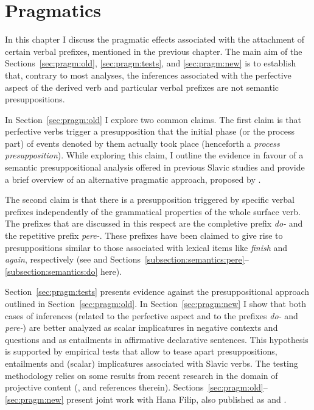 \chapter{Pragmatics} %
\label{Chapter6}
In this chapter I discuss the pragmatic effects associated with the attachment of certain verbal prefixes, mentioned in the previous chapter. The main aim of the Sections~\ref{sec:pragm:old}, \ref{sec:pragm:tests}, and \ref{sec:pragm:new} is to establish that, contrary to most analyses, the inferences associated with the perfective aspect of the derived verb and particular verbal prefixes are not semantic presuppositions. 

In Section~\ref{sec:pragm:old} I explore two common claims. The first claim is that perfective verbs trigger a presupposition that the initial phase (or the process part) of events denoted by them actually took place (henceforth a \textit{process presupposition}). While exploring this claim, I outline the evidence in favour of a semantic presuppositional analysis offered in previous Slavic studies and provide a brief overview of an alternative pragmatic approach, proposed by \citet{Gronn:04, Gronn:06}.

The second claim is that there is a presupposition triggered by specific verbal prefixes independently of the grammatical properties of the whole surface verb. The prefixes that are discussed in this respect are the completive prefix \textit{do-} and the repetitive prefix \textit{pere-}. These prefixes have been claimed to give rise to presuppositions similar to those associated with lexical items like \textit{finish} and \textit{again}, respectively (see \citealt{Kagan:book} and Sections~\ref{subsection:semantics:pere}--\ref{subsection:semantics:do} here).

Section~\ref{sec:pragm:tests} presents evidence against the presuppositional approach outlined in Section~\ref{sec:pragm:old}. In Section~\ref{sec:pragm:new}  I show that both cases of inferences (related to the perfective aspect and to the prefixes \textit{do-} and \textit{pere-}) are better analyzed as scalar implicatures in negative contexts and questions and as entailments in affirmative declarative sentences. This hypothesis is supported by empirical tests that allow to tease apart presuppositions, entailments and (scalar) implicatures associated with Slavic verbs. The testing methodology relies on some results from recent research in the domain of projective content (\citealp{Schlenker:08, Chemla:09, Romoli:11}, and references therein). Sections~\ref{sec:pragm:old}--\ref{sec:pragm:new} present joint work with Hana Filip, also published as \citealt{ZinovaFilip:SALT} and \citealt{ZinovaFilip:14}. %

